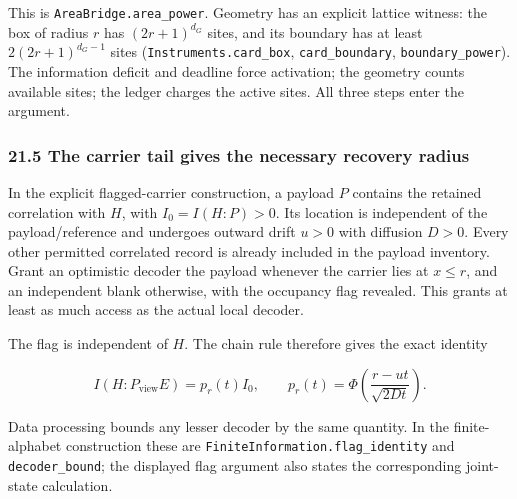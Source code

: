 \documentclass[
]{article}
\begin{document}
This is
\texttt{A\allowbreak{}r\allowbreak{}e\allowbreak{}a\allowbreak{}B\allowbreak{}r\allowbreak{}i\allowbreak{}d\allowbreak{}g\allowbreak{}e\allowbreak{}.\allowbreak{}a\allowbreak{}r\allowbreak{}e\allowbreak{}a\allowbreak{}\_\allowbreak{}p\allowbreak{}o\allowbreak{}w\allowbreak{}e\allowbreak{}r}.
Geometry has an explicit lattice witness: the box of radius \(r\) has
\((2r+1)^{d_G}\) sites, and its boundary has at least
\(2(2r+1)^{d_G-1}\) sites
(\texttt{I\allowbreak{}n\allowbreak{}s\allowbreak{}t\allowbreak{}r\allowbreak{}u\allowbreak{}m\allowbreak{}e\allowbreak{}n\allowbreak{}t\allowbreak{}s\allowbreak{}.\allowbreak{}c\allowbreak{}a\allowbreak{}r\allowbreak{}d\allowbreak{}\_\allowbreak{}b\allowbreak{}o\allowbreak{}x},
\texttt{card\_boundary}, \texttt{boundary\_power}). The information
deficit and deadline force activation; the geometry counts available
sites; the ledger charges the active sites. All three steps enter the
argument.

\subsubsection{21.5 The carrier tail gives the necessary recovery
radius}\label{the-carrier-tail-gives-the-necessary-recovery-radius}

In the explicit flagged-carrier construction, a payload \(P\) contains
the retained correlation with \(H\), with \(I_0=I(H:P)>0\). Its location
is independent of the
p\allowbreak{}a\allowbreak{}y\allowbreak{}l\allowbreak{}o\allowbreak{}a\allowbreak{}d\allowbreak{}/\allowbreak{}r\allowbreak{}e\allowbreak{}f\allowbreak{}e\allowbreak{}r\allowbreak{}e\allowbreak{}n\allowbreak{}c\allowbreak{}e
and undergoes outward drift \(u>0\) with diffusion \(D>0\). Every other
permitted correlated record is already included in the payload
inventory. Grant an optimistic decoder the payload whenever the carrier
lies at \(x\le r\), and an independent blank otherwise, with the
occupancy flag revealed. This grants at least as much access as the
actual local decoder.

The flag is independent of \(H\). The chain rule therefore gives the
exact identity

\[
I(H:P_{\mathrm{view}}E)=p_r(t)I_0,\qquad
p_r(t)=\Phi\!\left(\frac{r-ut}{\sqrt{2Dt}}\right).
\]

Data processing bounds any lesser decoder by the same quantity. In the
finite-alphabet construction these are
\texttt{F\allowbreak{}i\allowbreak{}n\allowbreak{}i\allowbreak{}t\allowbreak{}e\allowbreak{}I\allowbreak{}n\allowbreak{}f\allowbreak{}o\allowbreak{}r\allowbreak{}m\allowbreak{}a\allowbreak{}t\allowbreak{}i\allowbreak{}o\allowbreak{}n\allowbreak{}.\allowbreak{}f\allowbreak{}l\allowbreak{}a\allowbreak{}g\allowbreak{}\_\allowbreak{}i\allowbreak{}d\allowbreak{}e\allowbreak{}n\allowbreak{}t\allowbreak{}i\allowbreak{}t\allowbreak{}y}
and \texttt{decoder\_bound}; the displayed flag argument also states the
corresponding joint-state calculation.
\end{document}
